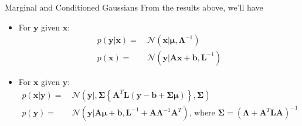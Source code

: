 \begin{frame}{\insertsubsection}

\begin{block}{Marginal and Conditioned Gaussians}
From the results above, we'll have
 \\
\begin{itemize}
\item \textcolor{UniGold}{For $\mathbf{y}$ given $\mathbf{x}$:}
\begin{align*}
p\left( \mathbf{y} | \mathbf{x} \right) =& \ \mathcal{N}\left( \mathbf{x}| \boldsymbol{\mu}, \boldsymbol{\Lambda}^{-1} \right) \\
p\left( \mathbf{x} \right) =& \ \mathcal{N}\left( \mathbf{y}| \mathbf{Ax}+\mathbf{b}, \mathbf{L}^{-1} \right)
\end{align*}

\item \textcolor{UniGold}{For $\mathbf{x}$ given $\mathbf{y}$:}
\begin{align*}
p\left( \mathbf{x} | \mathbf{y} \right) =& \ \mathcal{N}\left( \mathbf{y}| ,  \boldsymbol{\Sigma} \left\{ \mathbf{A}^T \mathbf{L}(\mathbf{y}-\mathbf{b} + \boldsymbol{\Sigma \mu}) \right\}, \boldsymbol{\Sigma} \right) \\
p\left( \mathbf{y} \right) =& \ \mathcal{N}\left( \mathbf{y}|\mathbf{A} \boldsymbol{\mu} + \mathbf{b}, \mathbf{L}^{-1} + \mathbf{A}\boldsymbol{\Lambda}^{-1}\mathbf{A}^T \right) \text{, where } \boldsymbol{\Sigma} = \left(  \boldsymbol{\Lambda} + \mathbf{A}^T \mathbf{LA} \right)^{-1}
\end{align*}
\end{itemize}

\end{block}
\end{frame}

